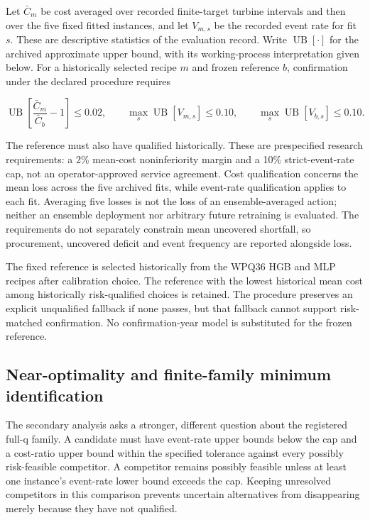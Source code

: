 \documentclass[
  british,
  11pt,
]{article}
\newcounter{none} %
\begin{document}
Let \(\bar C_m\) be cost averaged over recorded finite-target turbine
intervals and then over the five fixed fitted instances, and let
\(V_{m,s}\) be the recorded event rate for fit \(s\). These are
descriptive statistics of the evaluation record. Write
\(\operatorname{UB}[\cdot]\) for the archived approximate upper bound,
with its working-process interpretation given below. For a historically
selected recipe \(m\) and frozen reference \(b\), confirmation under the
declared procedure requires

\[
\operatorname{UB}\!\left[\frac{\bar C_m}{\bar C_b}-1\right]\leq0.02,
\qquad
\max_s \operatorname{UB}[V_{m,s}]\leq0.10,
\qquad
\max_s \operatorname{UB}[V_{b,s}]\leq0.10.
\]

The reference must also have qualified historically. These are
prespecified research requirements: a 2\% mean-cost noninferiority
margin and a 10\% strict-event-rate cap, not an operator-approved
service agreement. Cost qualification concerns the mean loss across the
five archived fits, while event-rate qualification applies to each fit.
Averaging five losses is not the loss of an ensemble-averaged action;
neither an ensemble deployment nor arbitrary future retraining is
evaluated. The requirements do not separately constrain mean uncovered
shortfall, so procurement, uncovered deficit and event frequency are
reported alongside loss.

The fixed reference is selected historically from the WPQ36 HGB and MLP
recipes after calibration choice. The reference with the lowest
historical mean cost among historically risk-qualified choices is
retained. The procedure preserves an explicit unqualified fallback if
none passes, but that fallback cannot support risk-matched confirmation.
No confirmation-year model is substituted for the frozen reference.

\subsection{Near-optimality and finite-family minimum
identification}\label{near-optimality-and-finite-family-minimum-identification}

The secondary analysis asks a stronger, different question about the
registered full-q family. A candidate must have event-rate upper bounds
below the cap and a cost-ratio upper bound within the specified
tolerance against every possibly risk-feasible competitor. A competitor
remains possibly feasible unless at least one instance's event-rate
lower bound exceeds the cap. Keeping unresolved competitors in this
comparison prevents uncertain alternatives from disappearing merely
because they have not qualified.
\end{document}
